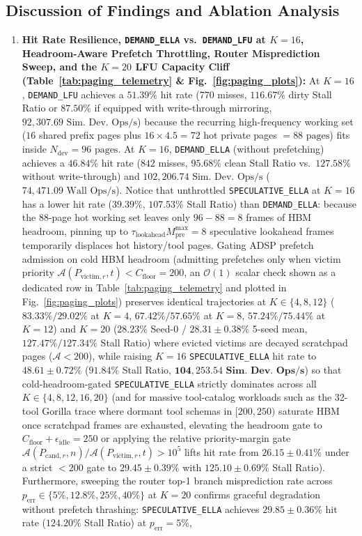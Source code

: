 \documentclass[conference,10pt]{IEEEtran}
\begin{document}
\subsection{Discussion of Findings and Ablation Analysis}
\begin{enumerate}
    \item \textbf{Hit Rate Resilience, \texttt{DEMAND\_ELLA} vs.\ \texttt{DEMAND\_LFU} at $K=16$, Headroom-Aware Prefetch Throttling, Router Misprediction Sweep, and the $K=20$ LFU Capacity Cliff (Table~\ref{tab:paging_telemetry} \& Fig.~\ref{fig:paging_plots}):} At $K=16$, \texttt{DEMAND\_LFU} achieves a $51.39\%$ hit rate ($770$ misses, $116.67\%$ dirty Stall Ratio or $87.50\%$ if equipped with write-through mirroring, $92{,}307.69\text{ Sim.\ Dev.\ Ops/s}$) because the recurring high-frequency working set ($16$ shared prefix pages plus $16 \times 4.5 = 72$ hot private pages $= 88\text{ pages}$) fits inside $N_{\text{dev}} = 96\text{ pages}$. At $K=16$, \texttt{DEMAND\_ELLA} (without prefetching) achieves a $46.84\%$ hit rate ($842$ misses, $95.68\%$ clean Stall Ratio vs.\ $127.58\%$ without write-through) and $102{,}206.74\text{ Sim.\ Dev.\ Ops/s}$ ($74{,}471.09\text{ Wall Ops/s}$). Notice that unthrottled \texttt{SPECULATIVE\_ELLA} at $K=16$ has a lower hit rate ($39.39\%$, $107.53\%$ Stall Ratio) than \texttt{DEMAND\_ELLA}: because the 88-page hot working set leaves only $96 - 88 = 8$ frames of HBM headroom, pinning up to $\tau_{\text{lookahead}} M_{\text{pre}}^{\max} = 8$ speculative lookahead frames temporarily displaces hot history/tool pages. Gating ADSP prefetch admission on cold HBM headroom (admitting prefetches only when victim priority $\mathcal{A}(P_{\text{victim}, r}, t) < C_{\text{floor}} = 200$, an $\mathcal{O}(1)$ scalar check shown as a dedicated row in Table~\ref{tab:paging_telemetry} and plotted in Fig.~\ref{fig:paging_plots}) preserves identical trajectories at $K \in \{4, 8, 12\}$ ($83.33\% / 29.02\%$ at $K=4$, $67.42\% / 57.65\%$ at $K=8$, $57.24\% / 75.44\%$ at $K=12$) and $K=20$ ($28.23\%$ Seed-0 / $28.31 \pm 0.38\%$ 5-seed mean, $127.47\% / 127.34\%$ Stall Ratio) where evicted victims are decayed scratchpad pages ($\mathcal{A} < 200$), while raising $K=16$ \texttt{SPECULATIVE\_ELLA} hit rate to $\mathbf{48.61 \pm 0.72\%}$ ($\mathbf{91.84\%}$ Stall Ratio, $\mathbf{104{,}253.54\text{ Sim.\ Dev.\ Ops/s}}$) so that cold-headroom-gated \texttt{SPECULATIVE\_ELLA} strictly dominates across all $K \in \{4, 8, 12, 16, 20\}$ (and for massive tool-catalog workloads such as the 32-tool Gorilla trace where dormant tool schemas in $[200, 250)$ saturate HBM once scratchpad frames are exhausted, elevating the headroom gate to $C_{\text{floor}} + \epsilon_{\text{idle}} = 250$ or applying the relative priority-margin gate $\mathcal{A}(P_{\text{cand}, r}, n)/\mathcal{A}(P_{\text{victim}, r}, t) > 10^5$ lifts hit rate from $26.15 \pm 0.41\%$ under a strict $<200$ gate to $\mathbf{29.45 \pm 0.39\%}$ with $\mathbf{125.10 \pm 0.69\%}$ Stall Ratio). Furthermore, sweeping the router top-1 branch misprediction rate across $p_{\text{err}} \in \{5\%, 12.8\%, 25\%, 40\%\}$ at $K=20$ confirms graceful degradation without prefetch thrashing: \texttt{SPECULATIVE\_ELLA} achieves $29.85 \pm 0.36\%$ hit rate ($124.20\%$ Stall Ratio) at $p_{\text{err}} = 5\%$, 
\end{enumerate}
\end{document}

